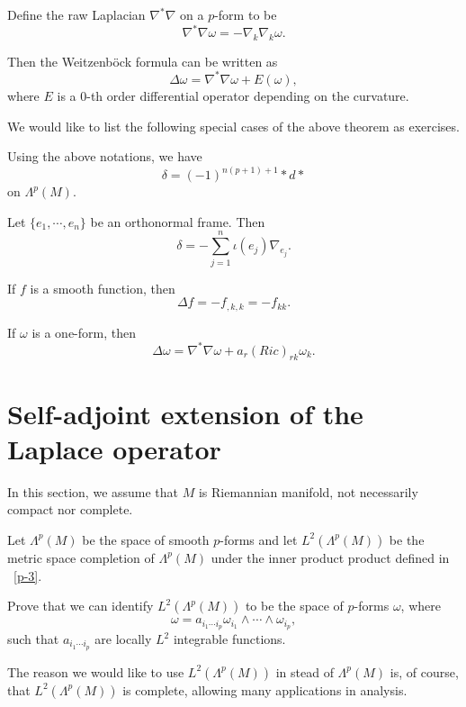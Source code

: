 Define the raw Laplacian $\nabla^*\nabla$  on a $p$-form to be
\[
\nabla^*\nabla\omega=-\nabla_k\nabla_k\omega.
\]

Then the Weitzenb\"ock formula can be written as
\[
\Delta\omega=\nabla^*\nabla\omega+E(\omega),
\]
where $E$ is a $0$-th order differential operator depending on the curvature.


We would like to list the following special cases of the above theorem as exercises.


\begin{ex}
Using the above notations, we have
\[
\delta=(-1)^{n(p+1)+1}*d*
\]
on $\Lambda^p(M)$.
\end{ex}

\begin{ex} Let $\{e_1,\cdots, e_n\}$ be an orthonormal frame. Then
\[
\delta=-\sum_{j=1}^n\iota(e_j)\nabla_{e_j}.
\]
\end{ex}


\begin{ex} If $f$ is a smooth function, then
\[
\Delta f=-f_{,k,k}=-f_{kk}.
\]
\end{ex}

\begin{ex} If $\omega$ is a one-form, then
\[
\Delta\omega=\nabla^*\nabla\omega+a_r(Ric)_{rk}\omega_k.
\]
\end{ex}



\section{Self-adjoint extension of the Laplace operator}\label{Operator_extension}
In this section, we assume that $M$ is Riemannian manifold, not necessarily compact nor complete. 

Let $\Lambda^p(M)$ be the space of smooth $p$-forms and 
let $L^2(\Lambda^p(M))$ be the metric space completion of $\Lambda^p(M)$ under the inner product product defined in ~\eqref{p-3}. 

\begin{ex}
Prove that we can identify $L^2(\Lambda^p(M))$ to be the space of $p$-forms $\omega$, where
\[
\omega=a_{i_1\cdots i_p}\omega_{i_1}\wedge\cdots\wedge\omega_{i_p},
\]
such that $a_{i_1\cdots i_p}$ are locally $L^2$ integrable functions.
\end{ex}

The reason we would like to use $L^2(\Lambda^p(M))$ in stead of $\Lambda^p(M)$ is, of course, that 
$L^2(\Lambda^p(M))$ is complete, allowing many applications in analysis.

